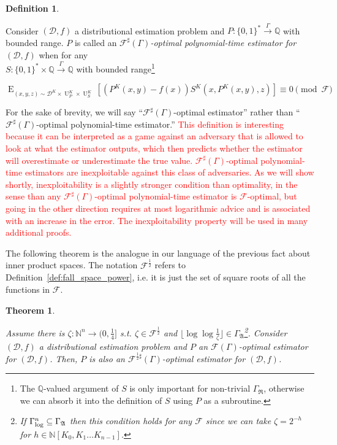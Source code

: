 \documentclass[11pt]{article}
\numberwithin{equation}{section}
\theoremstyle{definition}
\newtheorem{definition}{Definition}[section]
\theoremstyle{plain}
\newtheorem{theorem}{Theorem}[section]
\newcommand{\Bool}{\{0,1\}}
\newcommand{\Words}{{\Bool^*}}
\DeclareMathOperator{\E}{E}
\DeclareMathOperator{\Un}{U}
\newcommand{\Nats}{\mathbb{N}}
\newcommand{\Rats}{\mathbb{Q}}
\newcommand{\NatPoly}{\Nats[K_0, K_1 \ldots K_{n-1}]}
\newcommand{\NatFun}{\Nats^n \rightarrow}
\newcommand{\Floor}[1]{\lfloor #1 \rfloor}
\newcommand{\Dist}{\mathcal{D}}
\newcommand{\GrowR}{\Gamma_{\mathfrak{R}}}
\newcommand{\GrowA}{\Gamma_{\mathfrak{A}}}
\newcommand{\Fall}{\mathcal{F}}
\newcommand{\EG}{\Fall(\Gamma)}
\newcommand{\ESG}{\Fall^\sharp(\Gamma)}
\newcommand{\GammaLog}{\Gamma_{\textnormal{log}}}
\newcommand{\Scheme}{\xrightarrow{\Gamma}}
\begin{document}
\begin {definition}
\label{def:obe_sharp}

Consider $(\Dist,f)$ a distributional estimation problem and ${P: \Words \Scheme \Rats}$ with bounded range. $P$ is called an \emph{$\ESG$-optimal polynomial-time estimator for $(\Dist,f)$} when for any\\ ${S: \Words \times \Rats \Scheme \Rats}$ with bounded range\footnote{The $\Rats$-valued argument of $S$ is only important for non-trivial $\GrowR$, otherwise we can absorb it into the definition of $S$ using $P$ as a subroutine.}

\begin{equation}
\label{eqn:op_sharp}
\E_{(x,y,z) \sim \Dist^{K} \times \Un_P^{K} \times \Un_S^{K}}[(P^{K}(x,y) - f(x))S^{K}(x,P^{K}(x,y),z)] \equiv 0 \pmod \Fall
\end{equation}

For the sake of brevity, we will say \enquote{${\ESG}$-optimal estimator} rather than \enquote{${\ESG}$-optimal polynomial-time estimator.}
\textcolor{red}{This definition is interesting because it can be interpreted as a game against an adversary that is allowed to look at what the estimator outputs, which then predicts whether the estimator will overestimate or underestimate the true value. $\ESG$-optimal polynomial-time estimators are inexploitable against this class of adversaries. As we will show shortly, inexploitability is a slightly stronger condition than optimality, in the sense than any $\ESG$-optimal polynomial-time estimator is $\mathcal{F}$-optimal, but going in the other direction requires at most logarithmic advice and is associated with an increase in the error. The inexploitability property will be used in many additional proofs.}
\end {definition}

The following theorem is the analogue in our language of the previous fact about inner product spaces. The notation $\Fall^{\frac{1}{2}}$ refers to Definition~\ref{def:fall_space_power}, i.e. it is just the set of square roots of all the functions in $\Fall$.

\begin{theorem}
\label{thm:ort}

Assume there is $\zeta: \NatFun (0,\frac{1}{4}]$ s.t. $\zeta \in \Fall^{\frac{1}{2}}$ and ${\Floor{\log \log \frac{1}{\zeta}} \in \GrowA}$\footnote{If $\GammaLog^n \subseteq \GrowA$ then this condition holds for any $\Fall$ since we can take $\zeta = 2^{-h}$ for $h \in \NatPoly$.}. Consider $(\Dist,f)$ a distributional estimation problem and $P$ an $\EG$-optimal estimator for $(\Dist,f)$. Then, $P$ is also an $\Fall^{\frac{1}{2}\sharp}(\Gamma)$-optimal estimator for $(\Dist,f)$.

\end{theorem}
\end{document}
